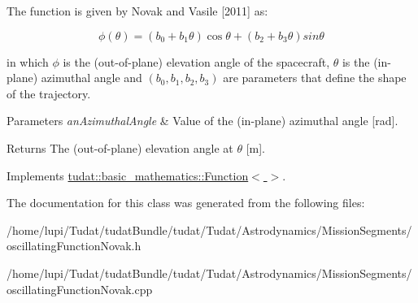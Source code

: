 The function is given by Novak and Vasile \mbox{[}2011\mbox{]} as\+:

\[ \phi ( \theta ) = \left( b_0 + b_1 \theta \right) \cos \theta + \left( b_2 + b_3 \theta \right) sin \theta \]

in which $ \phi $ is the (out-\/of-\/plane) elevation angle of the spacecraft, $ \theta $ is the (in-\/plane) azimuthal angle and $ ( b_0 ,b_1, b_2, b_3) $ are parameters that define the shape of the trajectory.


\begin{DoxyParams}{Parameters}
{\em an\+Azimuthal\+Angle} & Value of the (in-\/plane) azimuthal angle \mbox{[}rad\mbox{]}. \\
\hline
\end{DoxyParams}
\begin{DoxyReturn}{Returns}
The (out-\/of-\/plane) elevation angle at $ \theta $ \mbox{[}m\mbox{]}. 
\end{DoxyReturn}


Implements \hyperlink{classtudat_1_1basic__mathematics_1_1Function_a69b59769da9784abaaa8a0a309d16de8}{tudat\+::basic\+\_\+mathematics\+::\+Function$<$  $>$}.



The documentation for this class was generated from the following files\+:\begin{DoxyCompactItemize}
\item 
/home/lupi/\+Tudat/tudat\+Bundle/tudat/\+Tudat/\+Astrodynamics/\+Mission\+Segments/oscillating\+Function\+Novak.\+h\item 
/home/lupi/\+Tudat/tudat\+Bundle/tudat/\+Tudat/\+Astrodynamics/\+Mission\+Segments/oscillating\+Function\+Novak.\+cpp\end{DoxyCompactItemize}
